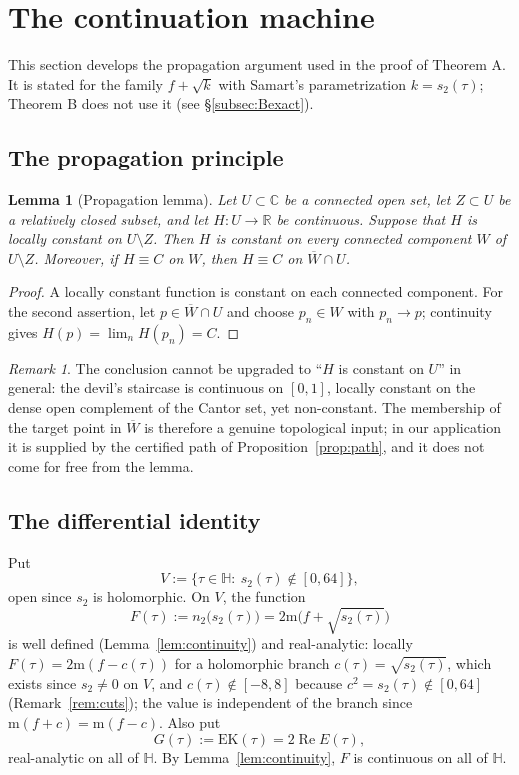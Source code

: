 \documentclass[11pt]{article}
\newtheorem{lemma}[theorem]{Lemma}
\theoremstyle{definition}
\theoremstyle{remark}
\newtheorem{remark}[theorem]{Remark}
\newcommand{\Hh}{\mathbb{H}}
\newcommand{\Cc}{\mathbb{C}}
\newcommand{\Rr}{\mathbb{R}}
\newcommand{\ReT}{\operatorname{Re}}
\newcommand{\m}{\mathrm{m}}
\begin{document}
\section{The continuation machine}\label{sec:machine}

This section develops the propagation argument used in the proof of
Theorem A. It is stated for the family $f+\sqrt{k}$ with Samart's
parametrization $k=s_2(\tau)$; Theorem B does not use it
(see \S\ref{subsec:Bexact}).

\subsection{The propagation principle}

\begin{lemma}[Propagation lemma]\label{lem:propagation}
Let $U\subset\Cc$ be a connected open set, let $Z\subset U$ be a relatively
closed subset, and let $H\colon U\to\Rr$ be continuous. Suppose that $H$ is
locally constant on $U\setminus Z$. Then $H$ is constant on every connected
component $W$ of $U\setminus Z$. Moreover, if $H\equiv C$ on $W$, then
$H\equiv C$ on $\overline{W}\cap U$.
\end{lemma}
\begin{proof}
A locally constant function is constant on each connected component. For
the second assertion, let $p\in\overline{W}\cap U$ and choose $p_n\in W$
with $p_n\to p$; continuity gives $H(p)=\lim_n H(p_n)=C$.
\end{proof}

\begin{remark}\label{rem:devil}
The conclusion cannot be upgraded to ``$H$ is constant on $U$'' in general:
the devil's staircase is continuous on $[0,1]$, locally constant on the
dense open complement of the Cantor set, yet non-constant. The membership
of the target point in $\overline{W}$ is therefore a genuine topological
input; in our application it is supplied by the certified path of
Proposition~\ref{prop:path}, and it does not come for free from the lemma.
\end{remark}

\subsection{The differential identity}\label{subsec:diffid}

Put
\[
  V:=\bigl\{\tau\in\Hh:\ s_2(\tau)\notin[0,64]\bigr\},
\]
open since $s_2$ is holomorphic. On $V$, the function
\[
  F(\tau):=n_2\bigl(s_2(\tau)\bigr)=2\m\bigl(f+\sqrt{s_2(\tau)}\bigr)
\]
is well defined (Lemma~\ref{lem:continuity}) and real-analytic: locally
$F(\tau)=2\m(f-c(\tau))$ for a holomorphic branch
$c(\tau)=\sqrt{s_2(\tau)}$, which exists since $s_2\neq0$ on $V$, and
$c(\tau)\notin[-8,8]$ because $c^2=s_2(\tau)\notin[0,64]$
(Remark~\ref{rem:cuts}); the value is independent of the branch since
$\m(f+c)=\m(f-c)$. Also put
\[
  G(\tau):=\mathrm{EK}(\tau)=2\ReT E(\tau),
\]
real-analytic on all of $\Hh$. By Lemma~\ref{lem:continuity}, $F$ is
continuous on all of $\Hh$.
\end{document}
